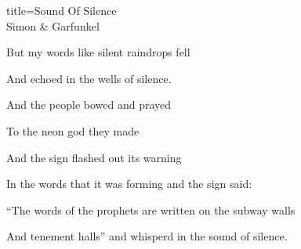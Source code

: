 \begin{song}{title=\centering Sound Of Silence \\\normalsize Simon \& Garfunkel  \vspace*{-0.3cm}}
{   But my words like silent raindrops fell 
   
   And echoed in the wells of silence. 
   
\sloka
   And the people bowed and prayed 
   
   To the neon god they made 
   
   And the sign flashed out its warning 
   
   In the words that it was forming and the sign said: 
   
   ``The words of the prophets are written on the subway walls 
   
    And tenement halls'' and whisper\ap d in the sound of silence. 
   

}
\setcounter{Slokočet}{0}
\end{song}
